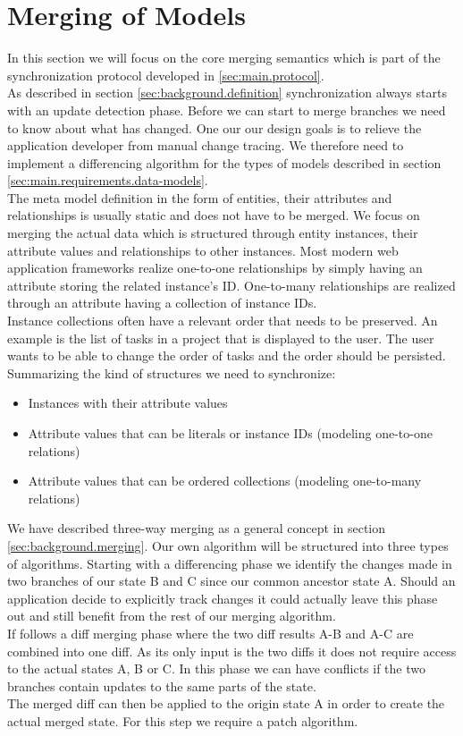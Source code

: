 \section{Merging of Models}
\label{sec:main.histo.merging}
In this section we will focus on the core merging semantics which is part of the synchronization protocol developed in \ref{sec:main.protocol}.\\
As described in section \ref{sec:background.definition} synchronization always starts with an update detection phase.
Before we can start to merge branches we need to know about what has changed.
One our our design goals is to relieve the application developer from manual change tracing.
We therefore need to implement a differencing algorithm for the types of models described in section \ref{sec:main.requirements.data-models}.\\
The meta model definition in the form of entities, their attributes and relationships is usually static and does not have to be merged.
We focus on merging the actual data which is structured through entity instances, their attribute values and relationships to other instances.
Most modern web application frameworks realize one-to-one relationships by simply having an attribute storing the related instance's ID.
One-to-many relationships are realized through an attribute having a collection of 
instance IDs.\\
Instance collections often have a relevant order that needs to be preserved.
An example is the list of tasks in a project that is displayed to the user.
The user wants to be able to change the order of tasks and the order should be persisted.\\
Summarizing the kind of structures we need to synchronize:

\begin{itemize}
\item Instances with their attribute values
\item Attribute values that can be literals or instance IDs (modeling one-to-one relations)
\item Attribute values that can be ordered collections (modeling one-to-many relations)
\end{itemize}

We have described three-way merging as a general concept in section \ref{sec:background.merging}.
Our own algorithm will be structured into three types of algorithms.
Starting with a differencing phase we identify the changes made in two branches of our state B and C since our common ancestor state A.
Should an application decide to explicitly track changes it could actually leave this phase out and still benefit from the rest of our merging algorithm.\\
If follows a diff merging phase where the two diff results A-B and A-C are combined into one diff.
As its only input is the two diffs it does not require access to the actual states A, B or C.
In this phase we can have conflicts if the two branches contain updates to the same parts of the state.\\
The merged diff can then be applied to the origin state A in order to create the actual merged state.
For this step we require a patch algorithm.


